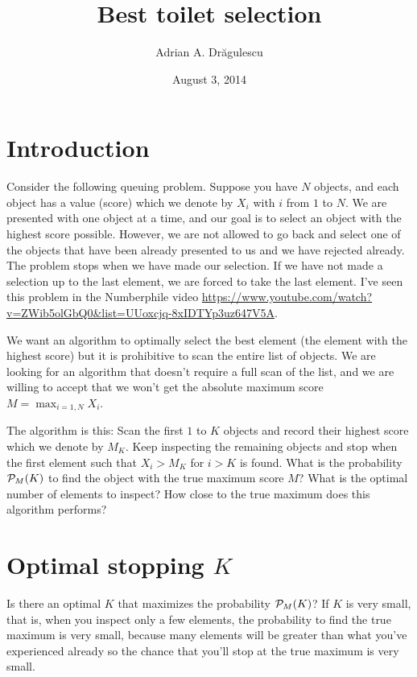 \documentclass[preprint]{revtex4}
\begin{document}
\title{Best toilet selection}
\author{Adrian A. Dr\u{a}gulescu}
\date{August 3, 2014}
\maketitle



\section{Introduction}
Consider the following queuing problem.  Suppose you have $N$ objects,
and each object has a value (score) which we denote by ${X_i}$ with
$i$ from $1$ to $N$.  We are presented with one object at a time, and
our goal is to select an object with the highest score possible.
However, we are not allowed to go back and select one of the objects
that have been already presented to us and we have rejected already.
The problem stops when we have made our selection.  If we have not
made a selection up to the last element, we are forced to take the
last element.  I've seen this problem in the Numberphile video
\url{https://www.youtube.com/watch?v=ZWib5olGbQ0&list=UUoxcjq-8xIDTYp3uz647V5A}.

We want an algorithm to optimally select the best element (the element
with the highest score) but it is prohibitive to scan the entire list
of objects.  We are looking for an algorithm that doesn't require a
full scan of the list, and we are willing to accept that we won't get
the absolute maximum score $M = \max_{i=1,N} X_i$.

The algorithm is this: Scan the first $1$ to $K$ objects and record
their highest score which we denote by $M_K$.  Keep inspecting the
remaining objects and stop when the first element such that 
$X_i > M_K$ for $i>K$ is found.  What is the probability ${\cal P}_M(K)$ to
find the object with the true maximum score $M$?  What is the optimal
number of elements to inspect?  How close to the true maximum does
this algorithm performs?

\section{Optimal stopping $K$} 

 Is there an optimal $K$ that maximizes the probability ${\cal
   P}_M(K)$?  If $K$ is very small, that is, when you inspect only a
 few elements, the probability to find the true maximum is very small,
 because many elements will be greater than what you've experienced
 already so the chance that you'll stop at the true maximum is very
 small. 
\end{document}
